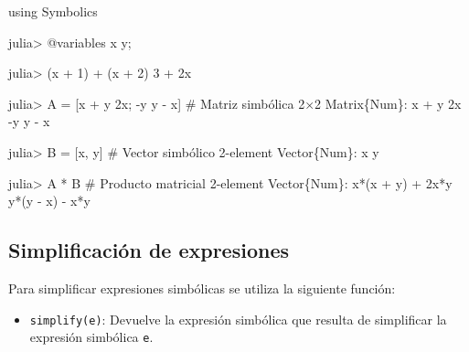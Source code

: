 \documentclass[
  letterpaper,
  DIV=11,
  numbers=noendperiod]{scrreprt}
\newenvironment{Shaded}{\begin{snugshade}}{\end{snugshade}}
\newcommand{\BuiltInTok}[1]{\textcolor[rgb]{0.00,0.23,0.31}{#1}}
\newcommand{\CommentTok}[1]{\textcolor[rgb]{0.37,0.37,0.37}{#1}}
\newcommand{\DataTypeTok}[1]{\textcolor[rgb]{0.68,0.00,0.00}{#1}}
\newcommand{\FloatTok}[1]{\textcolor[rgb]{0.68,0.00,0.00}{#1}}
\newcommand{\FunctionTok}[1]{\textcolor[rgb]{0.28,0.35,0.67}{#1}}
\newcommand{\ImportTok}[1]{\textcolor[rgb]{0.00,0.46,0.62}{#1}}
\newcommand{\NormalTok}[1]{\textcolor[rgb]{0.00,0.23,0.31}{#1}}
\newcommand{\OperatorTok}[1]{\textcolor[rgb]{0.37,0.37,0.37}{#1}}
\newcommand{\PreprocessorTok}[1]{\textcolor[rgb]{0.68,0.00,0.00}{#1}}
\providecommand{\tightlist}{%
  \setlength{\itemsep}{0pt}\setlength{\parskip}{0pt}}\usepackage{longtable,booktabs,array}
\begin{document}
\begin{Shaded}
\begin{Highlighting}[]
\ImportTok{using} \BuiltInTok{Symbolics}

\NormalTok{julia}\OperatorTok{\textgreater{}} \PreprocessorTok{@variables}\NormalTok{ x y;}

\NormalTok{julia}\OperatorTok{\textgreater{}}\NormalTok{ (x }\OperatorTok{+} \FloatTok{1}\NormalTok{) }\OperatorTok{+}\NormalTok{ (x }\OperatorTok{+} \FloatTok{2}\NormalTok{)}
\FloatTok{3} \OperatorTok{+} \FloatTok{2}\NormalTok{x}

\NormalTok{julia}\OperatorTok{\textgreater{}}\NormalTok{ A }\OperatorTok{=}\NormalTok{ [x }\OperatorTok{+}\NormalTok{ y }\FloatTok{2}\NormalTok{x; }\OperatorTok{{-}}\NormalTok{y y }\OperatorTok{{-}}\NormalTok{ x]  }\CommentTok{\# Matriz simbólica}
\FloatTok{2}\OperatorTok{×}\FloatTok{2} \DataTypeTok{Matrix}\NormalTok{\{Num\}}\OperatorTok{:}
\NormalTok{ x }\OperatorTok{+}\NormalTok{ y     }\FloatTok{2}\NormalTok{x}
    \OperatorTok{{-}}\NormalTok{y  y }\OperatorTok{{-}}\NormalTok{ x}

\NormalTok{julia}\OperatorTok{\textgreater{}}\NormalTok{ B }\OperatorTok{=}\NormalTok{ [x, y]  }\CommentTok{\# Vector simbólico}
\FloatTok{2}\OperatorTok{{-}}\NormalTok{element }\DataTypeTok{Vector}\NormalTok{\{Num\}}\OperatorTok{:}
\NormalTok{ x}
\NormalTok{ y}

\NormalTok{julia}\OperatorTok{\textgreater{}}\NormalTok{ A }\OperatorTok{*}\NormalTok{ B  }\CommentTok{\# Producto matricial}
\FloatTok{2}\OperatorTok{{-}}\NormalTok{element }\DataTypeTok{Vector}\NormalTok{\{Num\}}\OperatorTok{:}
 \FunctionTok{x*}\NormalTok{(x }\OperatorTok{+}\NormalTok{ y) }\OperatorTok{+} \FloatTok{2}\NormalTok{x}\OperatorTok{*}\NormalTok{y}
  \FunctionTok{y*}\NormalTok{(y }\OperatorTok{{-}}\NormalTok{ x) }\OperatorTok{{-}}\NormalTok{ x}\OperatorTok{*}\NormalTok{y}
\end{Highlighting}
\end{Shaded}

\hypertarget{simplificaciuxf3n-de-expresiones}{%
\subsection{Simplificación de
expresiones}\label{simplificaciuxf3n-de-expresiones}}

Para simplificar expresiones simbólicas se utiliza la siguiente función:

\begin{itemize}
\tightlist
\item
  \texttt{simplify(e)}: Devuelve la expresión simbólica que resulta de
  simplificar la expresión simbólica \texttt{e}.
\end{itemize}
\end{document}
